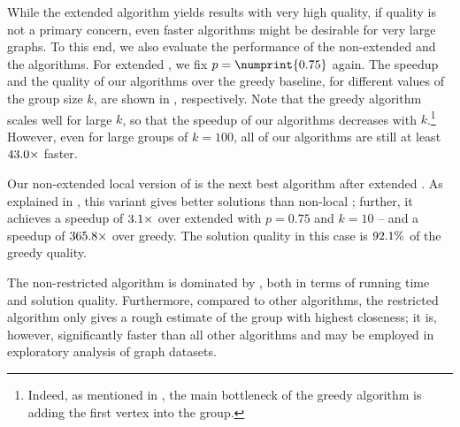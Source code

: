 While the extended \growshrink algorithm yields results with very high quality,
if quality is not a primary concern, even faster algorithms might be desirable
for very large graphs. To this end, we also evaluate the performance of the
non-extended \growshrink and the \localswaps algorithms.
%
For extended \growshrink, we fix $p = \numprint{0.75}$ again.
The speedup and the quality of our algorithms over the greedy baseline, for different
values of the group size $k$, are shown in
, respectively.
Note that the greedy algorithm scales well for large $k$, so that the speedup of
our algorithms decreases with $k$.\footnote{Indeed, as mentioned in ,
the main bottleneck of the greedy algorithm is adding the first vertex into the group.}
However, even for large groups of $k = 100$, all of our algorithms are still at
least $\onedigit{\minSpeedupKHundred}\times$ faster.

Our non-extended local version of \growshrink is the next best algorithm after
extended \growshrink. As explained in , this variant
gives better solutions than non-local \growshrink; further, it achieves a
speedup of $\onedigit{\gsLocalSpeedupOverNonLocal}\times$ over extended
\growshrink with $p = 0.75$ and $k = 10$ -- and a speedup of
$\onedigit{\gsLocalSpeedKTen}\times$ over greedy. The solution quality in this case
is $\onedigit{\gsLocalQualKTen}\%$ of the greedy quality.

The non-restricted \localswaps algorithm is dominated by \growshrink,
both in terms of running time and solution quality. Furthermore, compared
to other algorithms, the restricted \localswaps algorithm only gives a rough
estimate of the group with highest closeness; it is, however, significantly faster
than all other algorithms and may be employed in exploratory analysis of
graph datasets.

